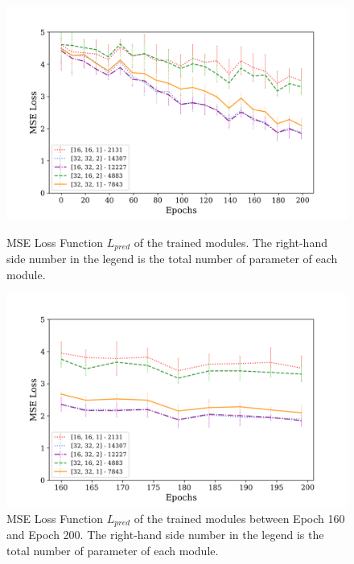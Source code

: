         \begin{figure}[hbtp]
                \centering
                \includegraphics[width=15cm, keepaspectratio]{images/results/module_parametertuning_1.png}
                \caption{MSE Loss Function $L_{pred}$ of the trained modules. The right-hand side number in the legend is the total number of parameter of each module.}
                \label{fig:results_parametertuning_1}
                
                \vspace{1.0cm}
                
                \includegraphics[width=15cm, keepaspectratio]{images/results/module_parametertuning_2.png}
                \caption{MSE Loss Function $L_{pred}$ of the trained modules between Epoch 160 and Epoch 200. The right-hand side number in the legend is the total number of parameter of each module.}
                \label{fig:results_parametertuning_2}
        \end{figure}
        
